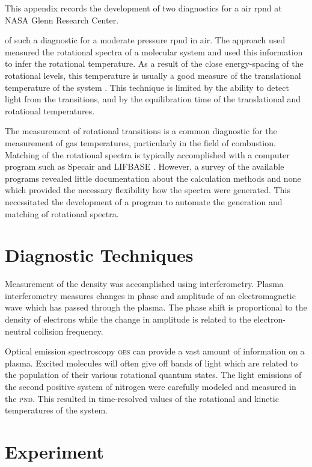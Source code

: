 This appendix records the development of two diagnostics for a air \acs{rpnd} at
NASA Glenn Research Center.

 of such a diagnostic for a moderate
pressure \acs{rpnd} in air. The approach used measured the rotational spectra of
a molecular system and used this information to infer the rotational
temperature. As a result of the close energy-spacing of the rotational levels,
this temperature is usually a good measure of the translational temperature of
the system \cite{Laux1993}. This technique is limited by the ability to detect
light from the transitions, and by the equilibration time of the translational
and rotational temperatures.

The measurement of rotational transitions is a common diagnostic for the
measurement of gas temperatures, particularly in the field of combustion.
Matching of the rotational spectra is typically accomplished with a computer
program such as Specair \cite{Laux2002} and LIFBASE \cite{Luque1999}. However, a
survey of the available programs revealed little documentation about the
calculation methods and none which provided the necessary flexibility how the
spectra were generated. This necessitated the development of a program to
automate the generation and matching of rotational spectra.

\section{Diagnostic Techniques}

Measurement of the density was accomplished using interferometry. Plasma
interferometry measures changes in phase and amplitude of an electromagnetic
wave which has passed through the plasma. The phase shift is proportional to the
density of electrons while the change in amplitude is related to the
electron-neutral collision frequency.

Optical emission spectroscopy \textsc{oes} can provide a vast amount of
information on a plasma. Excited molecules will often give off bands of light
which are related to the population of their various rotational quantum states.
The light emissions of the second positive system of nitrogen were carefully
modeled and measured in the \textsc{pnd}. This resulted in time-resolved values
of the rotational and kinetic temperatures of the system.

\section{Experiment}

